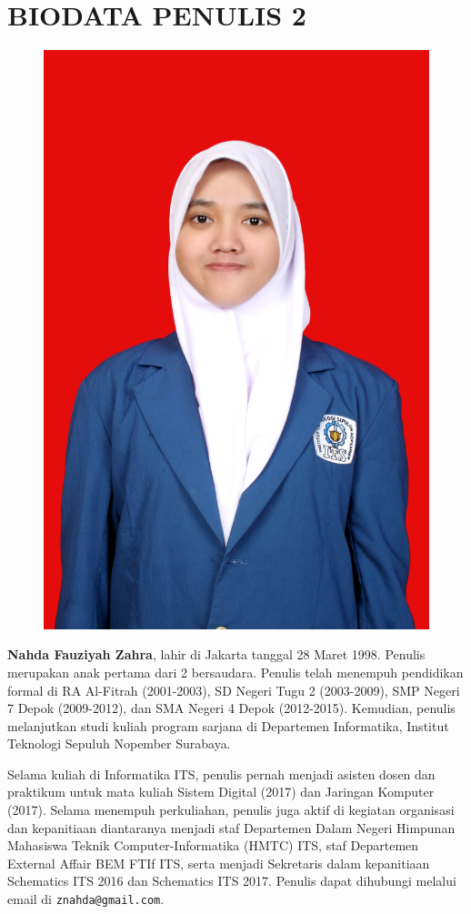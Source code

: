 \cleardoublepage


\newpage
\chapter{BIODATA PENULIS 2}
\begin{figure}
	\includegraphics[height=0.25\textheight]{biodata/img/foto-nahda.JPG}
\end{figure}

\textbf{Nahda Fauziyah Zahra}, lahir di Jakarta tanggal 28 Maret 1998. Penulis merupakan anak pertama dari 2 bersaudara. Penulis telah menempuh pendidikan formal di RA Al-Fitrah (2001-2003), SD Negeri Tugu 2 (2003-2009), SMP Negeri 7 Depok (2009-2012), dan SMA Negeri 4 Depok (2012-2015). Kemudian, penulis melanjutkan studi kuliah program sarjana di Departemen Informatika, Institut Teknologi Sepuluh Nopember Surabaya. 

Selama kuliah di Informatika ITS, penulis pernah menjadi asisten dosen dan praktikum untuk mata kuliah Sistem Digital (2017) dan Jaringan Komputer (2017). Selama menempuh perkuliahan, penulis juga aktif di kegiatan organisasi dan kepanitiaan diantaranya menjadi staf Departemen Dalam Negeri Himpunan Mahasiswa Teknik Computer-Informatika (HMTC) ITS, staf Departemen External Affair BEM FTIf ITS, serta menjadi Sekretaris dalam kepanitiaan Schematics ITS 2016 dan Schematics ITS 2017. Penulis dapat dihubungi melalui email di  \texttt{znahda@gmail.com}.